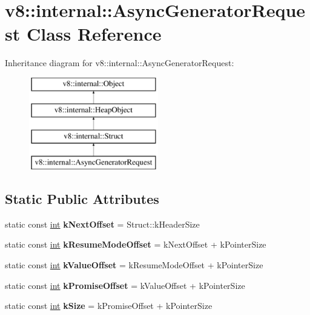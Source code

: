 \hypertarget{classv8_1_1internal_1_1AsyncGeneratorRequest}{}\section{v8\+:\+:internal\+:\+:Async\+Generator\+Request Class Reference}
\label{classv8_1_1internal_1_1AsyncGeneratorRequest}
Inheritance diagram for v8\+:\+:internal\+:\+:Async\+Generator\+Request\+:\begin{figure}[H]
\begin{center}
\leavevmode
\includegraphics[height=4.000000cm]{classv8_1_1internal_1_1AsyncGeneratorRequest}
\end{center}
\end{figure}
\subsection*{Static Public Attributes}
\begin{DoxyCompactItemize}
\item 
\mbox{\label{classv8_1_1internal_1_1AsyncGeneratorRequest_a4189246d4caf7d64a84862d917920c58}} 
static const \mbox{\hyperlink{classint}{int}} {\bfseries k\+Next\+Offset} = Struct\+::k\+Header\+Size
\item 
\mbox{\label{classv8_1_1internal_1_1AsyncGeneratorRequest_a08b30e7f8d658f90a8fe375ddceb762b}} 
static const \mbox{\hyperlink{classint}{int}} {\bfseries k\+Resume\+Mode\+Offset} = k\+Next\+Offset + k\+Pointer\+Size
\item 
\mbox{\label{classv8_1_1internal_1_1AsyncGeneratorRequest_a5c792e83ee73dae99df910a5fd32fa5c}} 
static const \mbox{\hyperlink{classint}{int}} {\bfseries k\+Value\+Offset} = k\+Resume\+Mode\+Offset + k\+Pointer\+Size
\item 
\mbox{\label{classv8_1_1internal_1_1AsyncGeneratorRequest_a03aa78282e09441c1650c514ae301e5f}} 
static const \mbox{\hyperlink{classint}{int}} {\bfseries k\+Promise\+Offset} = k\+Value\+Offset + k\+Pointer\+Size
\item 
\mbox{\label{classv8_1_1internal_1_1AsyncGeneratorRequest_ab9f5af74554f955a91c62c078f5551d4}} 
static const \mbox{\hyperlink{classint}{int}} {\bfseries k\+Size} = k\+Promise\+Offset + k\+Pointer\+Size
\end{DoxyCompactItemize}
